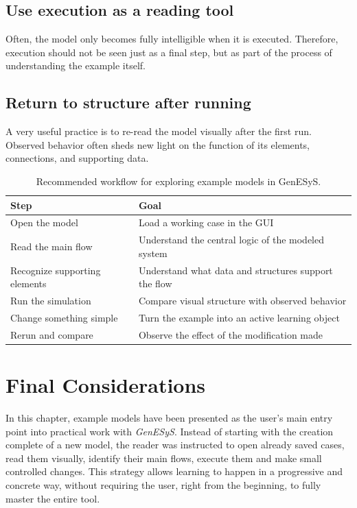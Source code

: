\subsection{Use execution as a reading tool}
\label{subsec:cap4_execucao_como_leitura}

Often, the model only becomes fully intelligible when it is executed. Therefore, execution should not be seen just as a final step, but as part of the process of understanding the example itself.

\subsection{Return to structure after running}
\label{subsec:cap4_volte_a_estrutura_apos_executar}

A very useful practice is to re-read the model visually after the first run. Observed behavior often sheds new light on the function of its elements, connections, and supporting data.

\begin{table}[htbp]
\centering
\caption{Recommended workflow for exploring example models in GenESyS.}
 \label{tab:cap4_roteiro_modelos_exemplo}
\small
 \begin{tabular}{|p{3.9cm}|p{6.8cm}|}
\hline
\textbf{Step} & \textbf{Goal} \\
\hline
Open the model & Load a working case in the GUI \\
\hline
Read the main flow & Understand the central logic of the modeled system \\
\hline
Recognize supporting elements & Understand what data and structures support the flow \\
\hline
Run the simulation & Compare visual structure with observed behavior \\
\hline
Change something simple & Turn the example into an active learning object \\
\hline
Rerun and compare & Observe the effect of the modification made \\
\hline
 \end{tabular}
\end{table}

\section{Final Considerations}
\label{sec:cap4_consideracoes_finais}

In this chapter, example models have been presented as the user's main entry point into practical work with \textit{GenESyS}. Instead of starting with the creation complete of a new model, the reader was instructed to open already saved cases, read them visually, identify their main flows, execute them and make small controlled changes. This strategy allows learning to happen in a progressive and concrete way, without requiring the user, right from the beginning, to fully master the entire tool.

